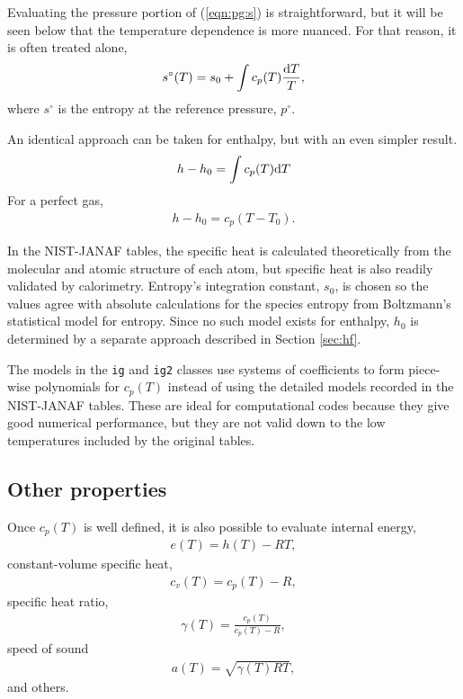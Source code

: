 Evaluating the pressure portion of (\ref{eqn:pg:s}) is straightforward, but it will be seen below that the temperature dependence is more nuanced.  For that reason, it is often treated alone,
\begin{align}
s^\circ(T) = s_0 + \int c_p(T) \frac{\mathrm{d} T}{T},
\end{align}
where $s^\circ$ is the entropy at the reference pressure, $p^\circ$.

An identical approach can be taken for enthalpy, but with an even simpler result.  
\begin{align}
h - h_0 = \int c_p(T) \mathrm{d} T \label{eqn:ig:h}
\end{align}
For a perfect gas,
\begin{align}
h - h_0 = c_p \left(T - T_0\right). \label{eqn:pg:h}
\end{align}

In the NIST-JANAF tables, the specific heat is calculated theoretically from the molecular and atomic structure of each atom, but specific heat is also readily validated by calorimetry.  Entropy's integration constant, $s_0$, is chosen so the values agree with absolute calculations for the species entropy from Boltzmann's statistical model for entropy.  Since no such model exists for enthalpy, $h_0$ is determined by a separate approach described in Section \ref{sec:hf}.

The models in the \texttt{ig} and \texttt{ig2} classes use systems of coefficients to form piece-wise polynomials for $c_p(T)$ instead of using the detailed models recorded in the NIST-JANAF tables.  These are ideal for computational codes because they give good numerical performance, but they are not valid down to the low temperatures included by the original tables.

\subsection{Other properties}

Once $c_p(T)$ is well defined, it is also possible to evaluate internal energy,
\begin{align}
e(T) = h(T) - RT,\label{eqn:ig:e}
\end{align}
constant-volume specific heat,
\begin{align}
c_v(T) = c_p(T) - R,\label{eqn:ig:cv}
\end{align}
specific heat ratio,
\begin{align}
\gamma(T) = \frac{c_p(T)}{c_p(T) - R},\label{eqn:ig:cp}
\end{align}
speed of sound
\begin{align}
a(T) = \sqrt{\gamma(T) R T},\label{eqn:ig:a}
\end{align}
and others.


